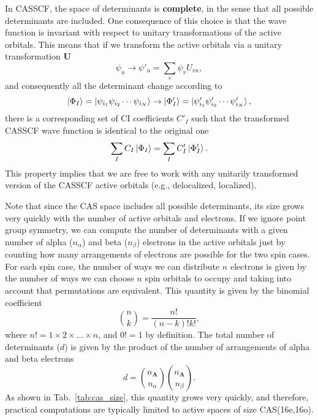 \documentclass[../Main/chem532-notes.tex]{subfiles}
\begin{document}
In CASSCF, the space of determinants is \textbf{complete}, in the sense that all possible determinants are included.
One consequence of this choice is that the wave function is invariant with respect to unitary transformations of the active orbitals.
This means that if we transform the active orbitals via a unitary transformation $\mathbf{U}$
\begin{equation}
\psi_u \rightarrow \psi'_u = \sum_v \psi_v U_{vu},
\end{equation}
and consequently all the determinant change according to
\begin{equation}
\ket{\Phi_I} = \ket{\psi_{i_1} \psi_{i_2} \cdots \psi_{i_N}}
\rightarrow  \ket{\Phi'_I} = \ket{\psi'_{i_1} \psi'_{i_2} \cdots \psi'_{i_N}},
\end{equation}
there is a corresponding set of CI coefficients $C'_I$ such that the transformed CASSCF wave function is identical to the original one
\begin{equation}
\sum_I C_I \ket{\Phi_I} = \sum_I C'_I \ket{\Phi'_I}.
\end{equation}
This property implies that we are free to work with any unitarily transformed version of the CASSCF active orbitals (e.g., delocalized, localized).

Note that since the CAS space includes all possible determinants, its size grows very quickly with the number of active orbitals and electrons.
If we ignore point group symmetry, we can compute the number of determinants with a given number of alpha ($n_\alpha$) and beta ($n_\beta$) electrons in the active orbitals just by counting how many arrangements of electrons are possible for the two spin cases.
For each spin case, the number of ways we can distribute $n$ electrons is given by the number of ways we can choose $n$ spin orbitals to occupy and taking into account that permutations are equivalent.
This quantity is given by the binomial coefficient
\begin{equation}
\binom{n}{k} = \frac{n!}{(n-k)! k!},
\end{equation}
where $n! = 1 \times 2 \times \ldots \times n$, and $0! = 1$ by definition.
The total number of determinants ($d$) is given by the product of the number of arrangements of alpha and beta electrons
\begin{equation}
d = \binom{n_\mathbf{A}}{n_\alpha} \binom{n_\mathbf{A}}{n_\beta}.
\end{equation}
As shown in Tab.~\ref{tab:cas_size}, this quantity grows very quickly, and therefore, practical computations are typically limited to active spaces of size CAS(16e,16o).
\end{document}

